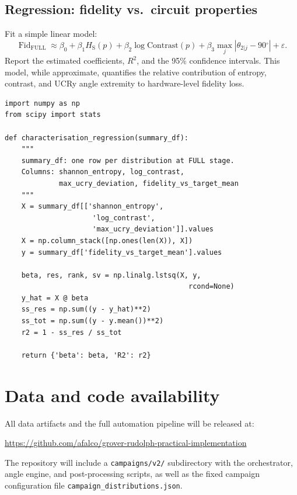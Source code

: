 \documentclass[11pt,a4paper]{article}
\providecommand{\dg}{\ensuremath{{}^{\circ}}}
\newcommand{\Fid}{\operatorname{Fid}}
\newcommand{\HS}{H_{\mathrm{S}}}
\begin{document}
\subsection{Regression: fidelity vs.\ circuit properties}

Fit a simple linear model:
\begin{equation}
  \Fid_{\mathrm{FULL}} \approx
    \beta_0
    + \beta_1 \HS(p)
    + \beta_2 \log\mathrm{Contrast}(p)
    + \beta_3 \max_j |\theta_{2|j} - 90\dg{}|
    + \varepsilon.
  \label{eq:regression}
\end{equation}
Report the estimated coefficients, $R^2$, and the 95\% confidence
intervals. This model, while approximate, quantifies the relative
contribution of entropy, contrast, and UCRy angle extremity to
hardware-level fidelity loss.

\begin{lstlisting}[caption={Cross-distribution regression.}]
import numpy as np
from scipy import stats

def characterisation_regression(summary_df):
    """
    summary_df: one row per distribution at FULL stage.
    Columns: shannon_entropy, log_contrast,
             max_ucry_deviation, fidelity_vs_target_mean
    """
    X = summary_df[['shannon_entropy',
                     'log_contrast',
                     'max_ucry_deviation']].values
    X = np.column_stack([np.ones(len(X)), X])
    y = summary_df['fidelity_vs_target_mean'].values

    beta, res, rank, sv = np.linalg.lstsq(X, y,
                                            rcond=None)
    y_hat = X @ beta
    ss_res = np.sum((y - y_hat)**2)
    ss_tot = np.sum((y - y.mean())**2)
    r2 = 1 - ss_res / ss_tot

    return {'beta': beta, 'R2': r2}
\end{lstlisting}

\section*{Data and code availability}

All data artifacts and the full automation pipeline will be
released at:
\begin{center}
  \url{https://github.com/afalco/grover-rudolph-practical-implementation}
\end{center}
The repository will include a \texttt{campaigns/v2/} subdirectory
with the orchestrator, angle engine, and post-processing scripts,
as well as the fixed campaign configuration file
\texttt{campaign\_distributions.json}.
\end{document}
